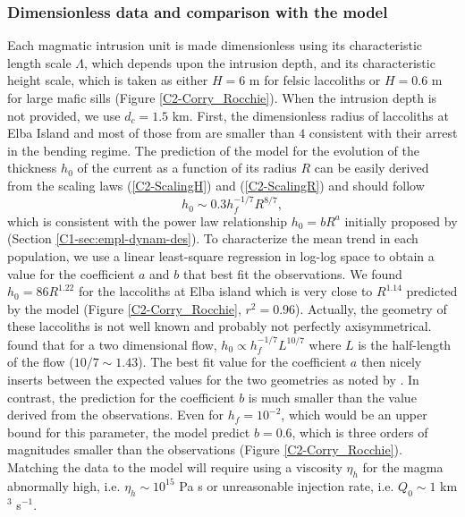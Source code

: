 \subsubsection*{Dimensionless data and comparison with the model}


Each  magmatic   intrusion  unit  is  made   dimensionless  using  its
characteristic  length   scale  $\Lambda$,  which  depends   upon  the
intrusion depth, and  its characteristic height scale,  which is taken
as either $H=6$  m for felsic laccoliths or $H=0.6$  m for large mafic
sills (Figure \ref{C2-Corry_Rocchie}). When the intrusion depth is not
provided, we  use $d_c=1.5$  km.  First,  the dimensionless  radius of
laccoliths at Elba Island and  most of those from \citet{E:2015tl} are
smaller than $4$  consistent with their arrest in  the bending regime.
The prediction of  the model for the evolution of  the thickness $h_0$
of the current as  a function of its radius $R$  can be easily derived
from the scaling laws  (\ref{C2-ScalingH}) and (\ref{C2-ScalingR}) and
should follow
\begin{equation}
  h_0 \sim 0.3h_f^{-1/7} R^{8/7}\label{C2-Hr},
\end{equation}
which  is consistent  with the  power  law relationship  $h_0 =  bR^a$
initially     proposed     by    \citet{McCaffrey:1997ea}     (Section
\ref{C1-sec:empl-dynam-des}).  To characterize the  mean trend in each
population, we use  a linear least-square regression  in log-log space
to obtain a  value for the coefficient  $a$ and $b$ that  best fit the
observations.  We found $h_0 = 86 R^{1.22}$ for the laccoliths at Elba
island  which is  very  close  to $R^{1.14}$  predicted  by the  model
(Figure \ref{C2-Corry_Rocchie},  $r^2=0.96$).  Actually,  the geometry
of  these laccoliths  is not  well  known and  probably not  perfectly
axisymmetrical.   \citet{Anonymous:QWXp_4JV}  found  that  for  a  two
dimensional  flow, $h_0\propto  h_f^{-1/7}L^{10/7}$ where  $L$ is  the
half-length of the flow ($10/7\sim 1.43$).  The best fit value for the
coefficient $a$  then nicely inserts  between the expected  values for
the two  geometries as noted by  \citet{Michaut:2011kg}.  In contrast,
the prediction for the coefficient $b$  is much smaller than the value
derived from the observations.  Even for $h_f=10^{-2}$, which would be
an upper bound for this parameter, the model predict $b=0.6$, which is
three  orders  of magnitudes  smaller  than  the observations  (Figure
\ref{C2-Corry_Rocchie}).  Matching the data  to the model will require
using  a  viscosity  $\eta_h$  for the  magma  abnormally  high,  i.e.
$\eta_h   \sim  10^{15}$   Pa  s   or  unreasonable   injection  rate,
i.e. $Q_0\sim 1$ km$^3$ s$^{-1}$.

